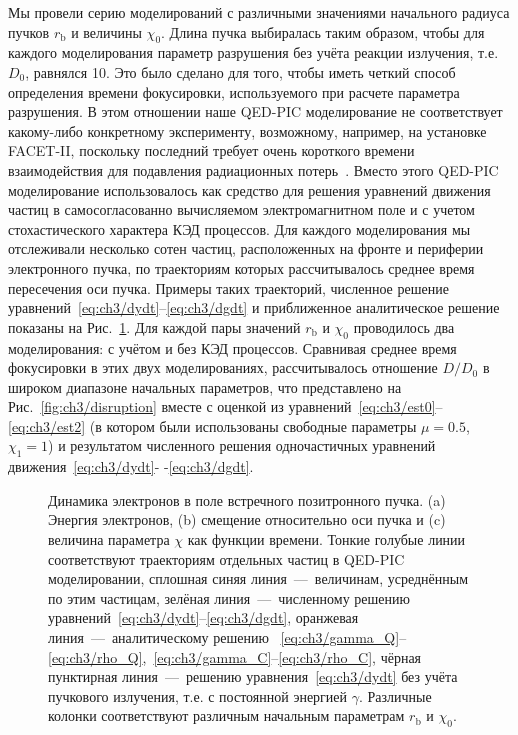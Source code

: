 Мы провели серию моделирований с различными значениями начального радиуса пучков $r_\mathrm{b}$ и величины $\chi_0$.
Длина пучка выбиралась таким образом, чтобы для каждого моделирования параметр разрушения без учёта реакции излучения, т.е. $D_0$, равнялся 10.
Это было сделано для того, чтобы иметь четкий способ определения времени фокусировки, используемого при расчете параметра разрушения.
В этом отношении наше QED-PIC моделирование не соответствует какому-либо конкретному эксперименту, возможному, например, на установке FACET-II, поскольку последний требует очень короткого времени взаимодействия для подавления радиационных потерь~\cite{yakimenko2019prospect}.
Вместо этого QED-PIC моделирование использовалось как средство для решения уравнений движения частиц в самосогласованно вычисляемом электромагнитном поле и с учетом стохастического характера КЭД процессов.
Для каждого моделирования мы отслеживали несколько сотен частиц, расположенных на фронте и периферии электронного пучка, по траекториям которых рассчитывалось среднее время пересечения оси пучка.
Примеры таких траекторий, численное решение уравнений~\eqref{eq:ch3/dydt}--\eqref{eq:ch3/dgdt} и приближенное аналитическое решение показаны на Рис.~\ref{fig:ch3/tracks}.
Для каждой пары значений $r_\mathrm{b}$ и $\chi_0$ проводилось два моделирования: с учётом и без КЭД процессов.
Сравнивая среднее время фокусировки в этих двух моделированиях, рассчитывалось отношение $D/D_0$ в широком диапазоне начальных параметров, что представлено на Рис.~\ref{fig:ch3/disruption} вместе с оценкой из уравнений~\eqref{eq:ch3/est0}-- \eqref{eq:ch3/est2} (в котором были использованы свободные параметры $\mu=0.5$, $\chi_1=1$) и результатом численного решения одночастичных уравнений движения~\eqref{eq:ch3/dydt}- -\eqref{eq:ch3/dgdt}.

\begin{figure}[ht]
    \caption[Динамика электронов в поле встречного позитронного пучка]{\label{fig:ch3/tracks} 
    Динамика электронов в поле встречного позитронного пучка. (a) Энергия электронов, (b) смещение относительно оси пучка и (c) величина параметра $\chi$ как функции времени.
    Тонкие голубые линии соответствуют траекториям отдельных частиц в QED-PIC моделировании, сплошная синяя линия~---~величинам, усреднённым по этим частицам, зелёная линия~---~численному решению уравнений~\eqref{eq:ch3/dydt}--\eqref{eq:ch3/dgdt}, оранжевая линия~---~аналитическому решению ~\eqref{eq:ch3/gamma_Q}--\eqref{eq:ch3/rho_Q},~\eqref{eq:ch3/gamma_C}--\eqref{eq:ch3/rho_C}, чёрная пунктирная линия~---~решению уравнения~\eqref{eq:ch3/dydt} без учёта пучкового излучения, т.е. с постоянной энергией $\gamma$.
    Различные колонки соответствуют различным начальным параметрам $r_\mathrm{b}$ и $\chi_0$.}
\end{figure}


